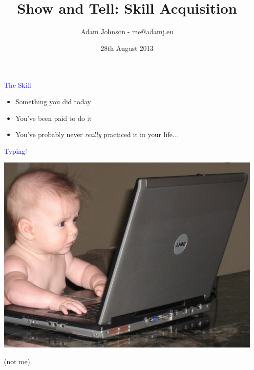 \documentclass[landscape]{slides}
\title{Show and Tell: Skill Acquisition}
\author{Adam Johnson - me@adamj.eu}
\date{28th August 2013}
\begin{document}
\maketitle








\begin{slide}

    \textcolor{blue}{\Large{The Skill}}

    \begin{itemize}
        \item Something you did today
        \item You've been paid to do it
        \item You've probably never \emph{really} practiced it in your life...
    \end{itemize}



\end{slide}


\begin{slide}

    \textcolor{blue}{\Large{Typing!}}

    \centering

    \includegraphics[height=10cm]{baby-nerd}

    (not me)

\end{slide}
\end{document}
